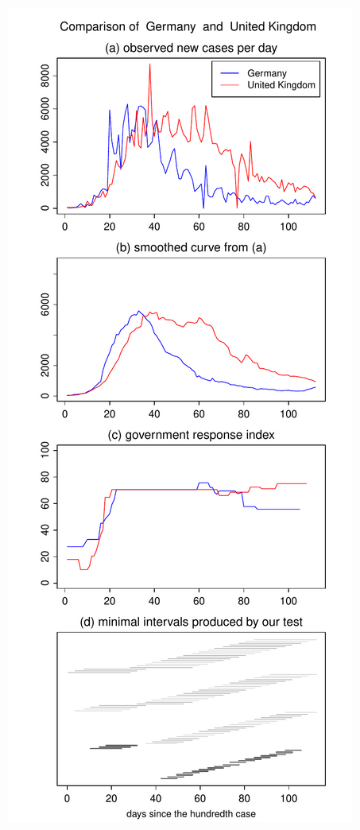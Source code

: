 \documentclass[a4paper,12pt]{article}
\numberwithin{equation}{section}
\begin{document}
\begin{figure}[t!]\ContinuedFloat
\begin{subfigure}[b]{0.49\textwidth}
\includegraphics[width=\textwidth]{plots/DEU_vs_GBR}

\end{subfigure}
\end{figure}
\end{document}
